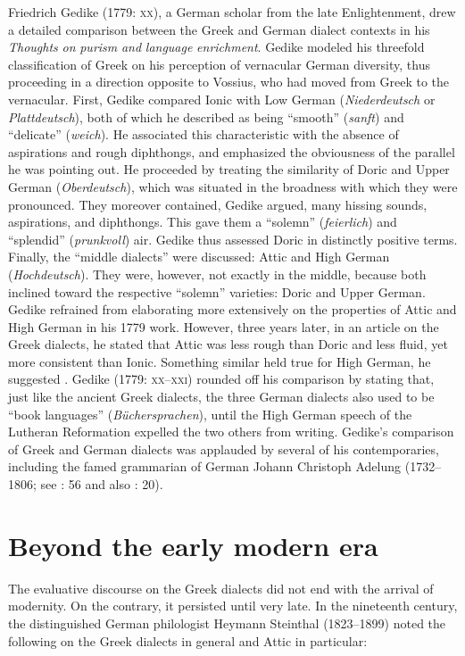 Friedrich Gedike (1779: \textsc{xx}), a German scholar from the late Enlightenment, drew a detailed comparison between the Greek and German dialect contexts in his \textit{Thoughts} \textit{on} \textit{purism} \textit{and} \textit{language} \textit{enrichment}. Gedike modeled his threefold classification of Greek on his perception of vernacular German diversity, thus proceeding in a direction opposite to Vossius, who had moved from Greek to the vernacular. First, Gedike compared Ionic with Low German (\textit{Niederdeutsch} or \textit{Plattdeutsch}), both of which he described as being “smooth” (\textit{sanft}) and “delicate” (\textit{weich}). He associated this characteristic with the absence of aspirations and rough diphthongs, and emphasized the obviousness of the parallel he was pointing out. He proceeded by treating the similarity of Doric and Upper German (\textit{Oberdeutsch}), which was situated in the broadness with which they were pronounced. They moreover contained, Gedike argued, many hissing sounds, aspirations, and diphthongs. This gave them a “solemn” (\textit{feierlich}) and “splendid” (\textit{prunkvoll}) air. Gedike thus assessed Doric in distinctly positive terms. Finally, the “middle dialects” were discussed: Attic and High German (\textit{Hochdeutsch}). They were, however, not exactly in the middle, because both inclined toward the respective “solemn” varieties: Doric and Upper German. Gedike refrained from elaborating more extensively on the properties of Attic and High German in his 1779 work. However, three years later, in an article on the Greek dialects, he stated that Attic was less rough than Doric and less fluid, yet more consistent than Ionic. Something similar held true for High German, he suggested \citep[25]{Gedike1782}. Gedike (1779: \textsc{xx–xxi)} rounded off his comparison by stating that, just like the ancient Greek dialects, the three German dialects also used to be “book languages” (\textit{Büchersprachen}), until the High German speech of the Lutheran Reformation expelled the two others from writing. Gedike’s comparison of Greek and German dialects was applauded by several of his contemporaries, including the famed grammarian of German Johann Christoph Adelung (1732–1806; see \citealt{Adelung1781}: 56 and also \citealt{Moritz1781}: 20).

\section{Beyond the early modern era}

The evaluative discourse on the Greek dialects did not end with the arrival of modernity. On the contrary, it persisted until very late. In the nineteenth century, the distinguished German philologist Heymann Steinthal (1823–1899) noted the following on the Greek dialects in general and Attic in particular:

